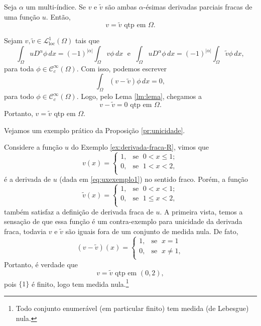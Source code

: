 \documentclass[a4paper, 11pt]{book}
\theoremstyle{definition}
\newcommand{\cC}{\mathcal{C}}
\newcommand{\cL}{\mathcal{L}}
\begin{document}
\begin{pbox} \label{pr:unicidade}
    Seja $\alpha$ um multi-índice. Se $v$ e $\tilde v$ são ambas $\alpha$-ésimas derivadas parciais fracas de uma função $u$.
    Então,
    \[
        v = \tilde v \text{ qtp em } \Omega.
    \]
\end{pbox}
\begin{prf}
    Sejam $v, \tilde v \in \cL^1_{\mathrm{loc}}(\Omega)$ tais que
    \[
        \int_\Omega u D^\alpha \phi \,dx = (-1)^{|\alpha|} \int_\Omega v \phi \,dx \;\text{ e }\; \int_\Omega u D^\alpha \phi \, dx= (-1)^{|\alpha|}\int_\Omega \tilde v \phi \,dx,
    \]
    para toda $\phi \in \cC^\infty_c(\Omega)$. Com isso, podemos escrever
    \[
        \int_\Omega (v - \tilde v) \phi \, dx = 0,
    \]
    para todo $\phi \in \cC^{\infty}_c(\Omega)$.
    Logo, pelo Lema \ref{lm:lema}, chegamos a
    \[
        v - \tilde v = 0 \text{ qtp em } \Omega.
    \]
    Portanto, $v = \tilde v$ qtp em $\Omega$.
\end{prf}

Vejamos um exemplo prático da Proposição \ref{pr:unicidade}.

\begin{ex}
    Considere a função $u$ do Exemplo \ref{ex:derivada-fraca-R}, vimos que
    \[
        v(x) = \left\{
            \begin{array}{rl}
                1, & \!\text{se }\; 0 < x \leqslant 1;\\
                0, & \!\text{se }\; 1 < x < 2,\\
            \end{array}
        \right.
    \]
    é a derivada de $u$ (dada em \ref{eq:uxexemplo1}) no sentido fraco.
    Porém, a função
    \[
        \tilde v(x) = \left\{
            \begin{array}{rl}
                1, & \text{se }\; 0 < x < 1;\\
                0, & \text{se }\; 1 \leqslant x < 2,\\
            \end{array}
        \right.
    \]
    também satisfaz a definição de derivada fraca de $u$.
    A primeira vista, temos a sensação de que essa função é um contra-exemplo para unicidade da derivada fraca, todavia $v$ e $\tilde v$ são iguais fora de um conjunto de medida nula.
    De fato,
    \[
        (v - \tilde v)(x) = \left\{
            \begin{array}{rl}
                1, & \text{se }\; x = 1\\
                0, & \text{se }\; x \neq 1,\\
            \end{array}
        \right.
    \]
    Portanto, é verdade que
    \[
        v = \tilde v \text{ qtp em } (0,2),
    \]
    pois $\{1\}$ é finito, logo tem medida nula.\footnote{Todo conjunto enumerável (em particular finito) tem medida (de Lebesgue) nula.}
\end{ex}
\end{document}
